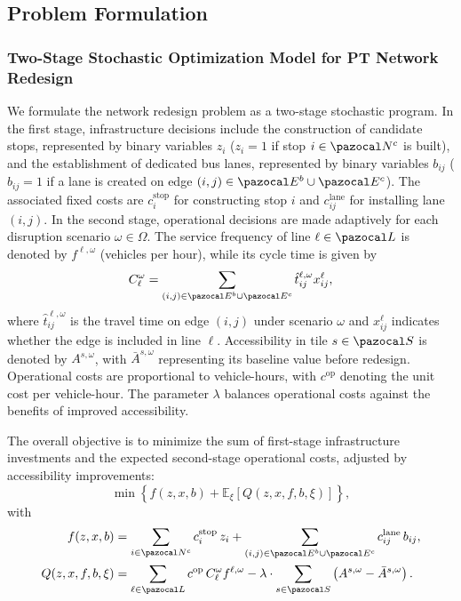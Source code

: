 \documentclass[3p,times,procedia]{elsarticle}
\begin{document}
\subsection{Problem Formulation}\label{sec:problemFormulation}
\subsubsection{Two-Stage Stochastic Optimization Model for PT Network Redesign}

We formulate the network redesign problem as a two-stage stochastic program. 
In the first stage, infrastructure decisions include the construction of candidate stops, represented by binary variables $z_i$ ($z_i=1$ if stop $i \in \pazocal N^c$ is built), and the establishment of dedicated bus lanes, represented by binary variables $b_{ij}$ ($b_{ij}=1$ if a lane is created on edge $(i,j) \in \pazocal E^b \cup \pazocal E^c$). 
The associated fixed costs are $c_i^{\text{stop}}$ for constructing stop $i$ and $c_{ij}^{\text{lane}}$ for installing lane $(i,j)$.  
%
In the second stage, operational decisions are made adaptively for each disruption scenario $\omega \in \Omega$. 
The service frequency of line $\ell \in \pazocal L$ is denoted by $f^{\ell,\omega}$ (vehicles per hour), while its cycle time is given by
\[
C_{\ell}^{\omega} = \sum_{(i,j) \in \pazocal E^b \cup \pazocal E^c} \hat{t}_{ij}^{\ell,\omega} x_{ij}^{\ell},
\]
where $\hat{t}_{ij}^{\ell,\omega}$ is the travel time on edge $(i,j)$ under scenario $\omega$ and $x_{ij}^\ell$ indicates whether the edge is included in line $\ell$. 
Accessibility in tile $s \in \pazocal S$ is denoted by $A^{s,\omega}$, with $\bar{A}^{s,\omega}$ representing its baseline value before redesign. 
Operational costs are proportional to vehicle-hours, with $c^{\text{op}}$ denoting the unit cost per vehicle-hour. 
The parameter $\lambda$ balances operational costs against the benefits of improved accessibility.  

The overall objective is to minimize the sum of first-stage infrastructure investments and the expected second-stage operational costs, adjusted by accessibility improvements:
\begin{equation}
\min \left\{ f(z,x,b) + \mathbb{E}_{\xi}[Q(z,x,f,b,\xi)] \right\},
\label{eq:obj}
\end{equation}
with
\begin{align}
f(z,x,b) &= \sum_{i \in \pazocal N^c} c_i^{\text{stop}} \, z_i 
+ \sum_{(i,j) \in \pazocal E^b \cup \pazocal E^{c}} c_{ij}^{\text{lane}} \, b_{ij}, 
\label{eq:obj1} \\
Q(z,x,f,b,\xi) &= \sum_{\ell \in \pazocal L} c^{\text{op}} \, C_{\ell}^{\omega} f^{\ell,\omega} 
- \lambda \cdot \sum_{s \in \pazocal S} \left(A^{s,\omega} - \bar{A}^{s,\omega}\right).
\label{eq:obj2}
\end{align}
\end{document}

